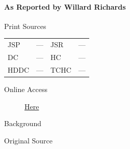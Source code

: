 			\paragraph{As Reported by Willard Richards}
				\label{EMS-1841-JS-7-NOV-1841-WR}
				
				\begin{description}
					\item[Print Sources]
				\end{description}	

				\begin{tabular}{p{0.5in}p{1in}p{0.5in}p{1in}}
					JSP	 	& ---		& JSR 		& --- \\
					DC	 	& ---		& HC 		& --- \\
					HDDC 	& ---		& TCHC 		& --- \\
				\end{tabular}
				
				\begin{description}
					\item[Online Access] \href{https://www.josephsmithpapers.org/paper-summary/discourse-7november-1841-as-reported-by-willard-richards/1}{Here}
				\end{description}
				
				\begin{description}
					\item[Background]
				\end{description}
				
				
				\begin{description}
					\item[Original Source]
				\end{description}
				
				
